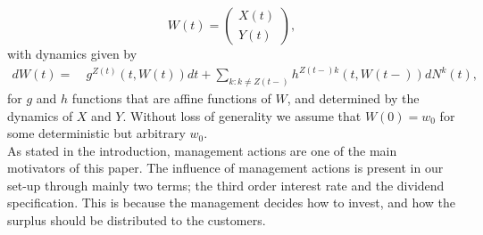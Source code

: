 \documentclass[12pt]{article}
\newcommand{\R}{\mathbb{R}}
\newcommand{\noin}{\noindent}
\theoremstyle{my_thm}
\theoremstyle{my_rem}
\begin{document}
$$
W(t)= \begin{pmatrix}
X(t)\\
Y(t)
\end{pmatrix},
$$
with dynamics given by
\begin{align*}
dW(t)= \ & g^{Z(t)}(t,W(t)) dt+ \sum_{k:k\neq Z(t-)} h^{Z(t-)k}(t,W(t-)) dN^k(t),
\end{align*}
for $g$ and $h$ functions that are affine functions of $W$, and determined by the dynamics of $X$ and $Y$. Without loss of generality we assume that $W(0)=w_0$ for some deterministic but arbitrary $w_0$. %
\\[12pt]
\noin As stated in the introduction, management actions are one of the main motivators of this paper. The influence of management actions is present in our set-up through mainly two terms; the third order interest rate and the dividend specification. This is because the management decides how to invest, and how the surplus should be distributed to the customers.
\end{document}
